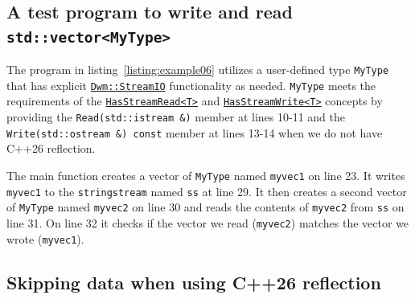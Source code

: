 \begin{minipage}{\textwidth}
  
\end{minipage}

\pagebreak
\subsection{A test program to write and read \texttt{std::vector<MyType>}}
The program in listing~\ref{listing:example06} utilizes a user-defined type
\texttt{MyType} that has explicit
\hyperref[section:DwmStreamIOClass]{\texttt{Dwm::StreamIO}} functionality as
needed.  \texttt{MyType} meets the requirements of the
\hyperlink{concept:HasStreamRead}{\texttt{HasStreamRead<T>}}
and
\hyperlink{concept:HasStreamWrite}{\texttt{HasStreamWrite<T>}}
concepts by providing the \texttt{Read(std::istream \&)} member at lines
10-11 and the \texttt{Write(std::ostream \&) const} member at lines 13-14
when we do not have C++26 reflection.

\begin{minipage}{\textwidth}
  
\end{minipage}

The main function creates a vector of \texttt{MyType} named \texttt{myvec1}
on line 23.  It writes \texttt{myvec1} to the \texttt{stringstream} named
\texttt{ss} at line 29.  It then creates a second vector of \texttt{MyType}
named \texttt{myvec2} on line 30 and reads the contents of \texttt{myvec2}
from \texttt{ss} on line 31.  On line 32 it checks if the vector we
read (\texttt{myvec2}) matches the vector we wrote (\texttt{myvec1}).

\pagebreak
\subsection{Skipping data when using C++26 reflection}
